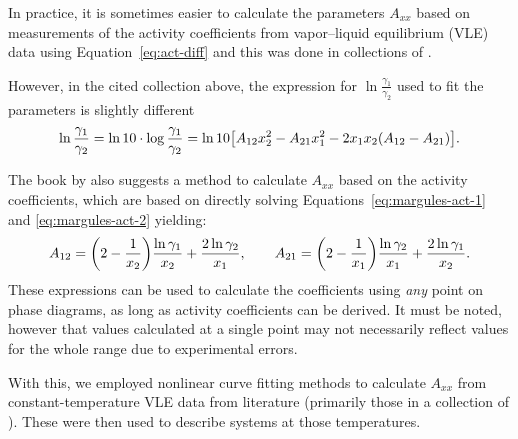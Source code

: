 In practice, it is sometimes easier to calculate the parameters $A_{xx}$ based on
measurements of the activity coefficients from vapor--liquid equilibrium (VLE) data 
using Equation~\ref{eq:act-diff} and this was done in collections of .

However, in the cited collection above, the expression for 
$\ln\frac{\gamma_1}{\gamma_2}$ used to fit the parameters is slightly different
\[
    \ln\dfrac{\gamma_1}{\gamma_2} = \ln 10 \cdot
    \log \dfrac{\gamma_1}{\gamma_2} = \ln 10 \qty[ A_{12}x_2^2 - A_{21}x_1^2 - 2x_1x_2
    (A_{12} - A_{21}) ].
\]

The book by  also suggests a method to calculate $A_{xx}$
based on the activity coefficients, which are based on directly solving
Equations~\ref{eq:margules-act-1} and \ref{eq:margules-act-2} yielding:
\[
    A_{12} = \qty(2 - \frac1{x_2}) \dfrac{\ln\gamma_1}{x_2} + 
    \dfrac{2\ln\gamma_2}{x_1},\qquad
    A_{21} = \qty(2 - \frac1{x_1}) \dfrac{\ln\gamma_2}{x_1} + 
    \dfrac{2\ln\gamma_1}{x_2}.
\]
These expressions can be used to calculate the coefficients using \textit{any} point
on phase diagrams, as long as activity coefficients can be derived. It must be noted,
however that values calculated at a single point may not necessarily 
reflect values for the whole range due to experimental errors.

With this, we employed nonlinear curve fitting methods to calculate $A_{xx}$ from 
constant-temperature VLE data from literature (primarily those in a collection of 
). These were then used to describe systems at those temperatures.
